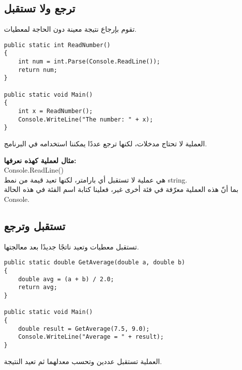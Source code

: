 \documentclass[12pt]{article}
\begin{document}
\subsection{ترجع ولا تستقبل}
تقوم بإرجاع نتيجة معينة دون الحاجة لمعطيات.

\begin{boxExample}
\begin{english}
\begin{verbatim}
public static int ReadNumber()
{
    int num = int.Parse(Console.ReadLine());
    return num;
}

public static void Main()
{
    int x = ReadNumber();
    Console.WriteLine("The number: " + x);
}
\end{verbatim}
\end{english}
\end{boxExample}

العملية لا تحتاج مدخلات، لكنها ترجع عددًا يمكننا استخدامه في البرنامج.

\textbf{مثال لعملية كهذه نعرفها:} \\
\textenglish{Console.ReadLine()} \\
هي عملية لا تستقبل أي بارامتر، لكنها تعيد قيمة من نمط \textenglish{string}. \\
بما أنّ هذه العملية معرّفة في فئة أخرى غير، فعلينا كتابة اسم الفئة في هذه الحالة \textenglish{Console}.

\subsection{تستقبل وترجع}
تستقبل معطيات وتعيد ناتجًا جديدًا بعد معالجتها.

\begin{boxExample}
\begin{english}
\begin{verbatim}
public static double GetAverage(double a, double b)
{
    double avg = (a + b) / 2.0;
    return avg;
}

public static void Main()
{
    double result = GetAverage(7.5, 9.0);
    Console.WriteLine("Average = " + result);
}
\end{verbatim}
\end{english}
\end{boxExample}

العملية تستقبل عددين وتحسب معدلهما ثم تعيد النتيجة.
\end{document}
